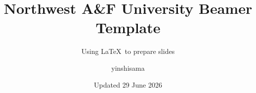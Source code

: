 \documentclass{beamer}
\title{Northwest A\&F University Beamer Template}
\subtitle{Using \LaTeX\ to prepare slides}
\author{yinshisama}
\date{Updated 29 June 2026}
\begin{document}
\maketitle



\QApage
\end{document}
